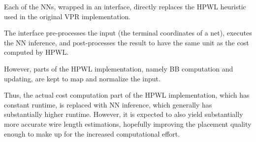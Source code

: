 Each of the \glspl{NN}, wrapped in an interface, directly replaces the \gls{HPWL} heuristic used in the original \gls{VPR} implementation.

The interface pre-processes the input (the terminal coordinates of a net), executes the \gls{NN} inference, and post-processes the result to have the same unit as the cost computed by \gls{HPWL}.

However, parts of the \gls{HPWL} implementation, namely \gls{BB} computation and updating, are kept to map and normalize the input.

Thus, the actual cost computation part of the \gls{HPWL} implementation, which has constant runtime, is replaced with \gls{NN} inference, which generally has substantially higher runtime. However, it is expected to also yield substantially more accurate wire length estimations, hopefully improving the placement quality enough to make up for the increased computational effort.


